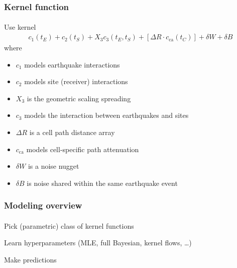 \documentclass{beamer}                             %
\newenvironment{wideitemize}
  {\itemize\setlength{\itemsep}{0.5cm}}
  {\enditemize}
\begin{document}
\begin{frame}
\frametitle{Kernel function}
\framesubtitle{}

\begin{wideitemize}
  \item<+-> Use kernel
    \begin{align*}
      c_1(t_E)
      + c_2(t_S)
      + X_3 c_3 (t_E, t_S)
      + [\Delta R \cdot c_{\text{ca}}(t_C)]
      + \delta W
      + \delta B
    \end{align*}
  where
    \begin{itemize}
      \item \( c_1 \) models earthquake interactions
      \item \( c_2 \) models site (receiver) interactions
      \item \( X_3 \) is the geometric scaling spreading
      \item \( c_3 \) models the interaction between earthquakes and sites
      \item \( \Delta R \) is a cell path distance array
      \item \( c_{\text{ca}} \) models cell-specific path attenuation
      \item \( \delta W \) is a noise nugget
      \item \( \delta B \) is noise shared within the same earthquake event
    \end{itemize}
\end{wideitemize}
\end{frame}

\begin{frame}
\frametitle{Modeling overview}
\framesubtitle{}

\begin{wideitemize}
  \item Pick (parametric) class of kernel functions
  \item Learn hyperparameters (MLE, full Bayesian, kernel flows, \ldots)
  \item Make predictions
\end{wideitemize}
\end{frame}
\end{document}
